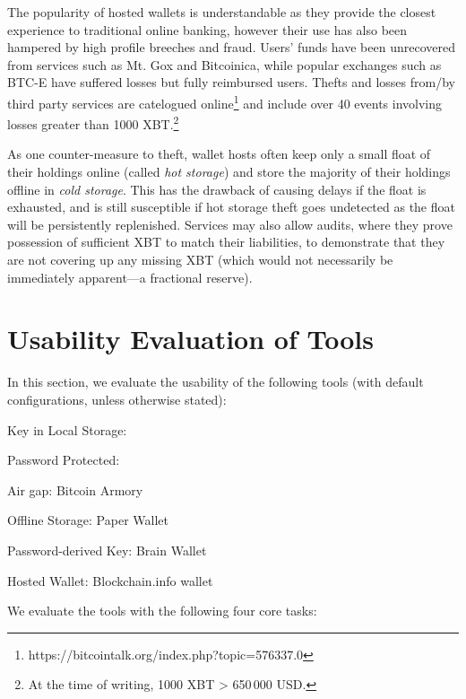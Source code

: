 The popularity of hosted wallets is understandable as they provide the closest experience to traditional online banking, however their use has also been hampered by high profile breeches and fraud. Users' funds have been unrecovered from services such as Mt. Gox and Bitcoinica, while popular exchanges such as BTC-E have suffered losses but fully reimbursed users. Thefts and losses from/by third party services are catelogued online\footnote{https://bitcointalk.org/index.php?topic=576337.0} and include over 40 events involving losses greater than 1000 XBT.\footnote{At the time of writing, 1000 XBT > 650\,000 USD.}

As one counter-measure to theft, wallet hosts often keep only a small float of their holdings online (called \textit{hot storage}) and store the majority of their holdings offline in \textit{cold storage}. This has the drawback of causing delays if the float is exhausted, and is still susceptible if hot storage theft goes undetected as the float will be persistently replenished. Services may also allow audits, where they prove possession of sufficient XBT to match their liabilities, to demonstrate that they are not covering up any missing XBT (which would not necessarily be immediately apparent---\cf a fractional reserve).  


\section{Usability Evaluation of Tools}

In this section, we evaluate the usability of the following tools (with default configurations, unless otherwise stated):

\begin{compactlist}
	\item[\bf 1] Key in Local Storage:  \bitcoinclient 
	\item[\bf 2] Password Protected: \multibit 
	\item[\bf 3] Air gap: Bitcoin Armory
	\item[\bf 4] Offline Storage: Paper Wallet
	\item[\bf 5] Password-derived Key: Brain Wallet
	\item[\bf 6] Hosted Wallet: Blockchain.info wallet
\end{compactlist}

We evaluate the tools with the following four core tasks:

